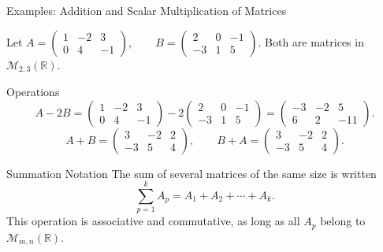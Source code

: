 \documentclass[aspectratio=169]{beamer}
\begin{document}
\begin{frame}{Examples: Addition and Scalar Multiplication of Matrices}

\begin{block}{}
Let
$
A =
\begin{pmatrix}
1 & -2 & 3 \\
0 & 4 & -1
\end{pmatrix},
\qquad
B =
\begin{pmatrix}
2 & 0 & -1 \\
-3 & 1 & 5
\end{pmatrix}.
$
Both are matrices in $\mathcal{M}_{2,3}(\mathbb{R})$.
\end{block}

\pause

\begin{block}{Operations}
\[
A - 2B =
\begin{pmatrix}
1 & -2 & 3 \\
0 & 4 & -1
\end{pmatrix}
-
2\begin{pmatrix}
2 & 0 & -1 \\
-3 & 1 & 5
\end{pmatrix}
=
\begin{pmatrix}
-3 & -2 & 5 \\
6 & 2 & -11
\end{pmatrix}.
\]
\pause
\[
A + B =
\begin{pmatrix}
3 & -2 & 2 \\
-3 & 5 & 4
\end{pmatrix},
\qquad
B + A =
\begin{pmatrix}
3 & -2 & 2 \\
-3 & 5 & 4
\end{pmatrix}.
\]
\end{block}

\pause

\begin{block}{Summation Notation}
The sum of several matrices of the same size is written
\[
\sum_{p=1}^k A_p = A_1 + A_2 + \cdots + A_k.
\]
This operation is associative and commutative, as long as all $A_p$ belong to $\mathcal{M}_{m,n}(\mathbb{R})$.
\end{block}

\end{frame}
\end{document}
